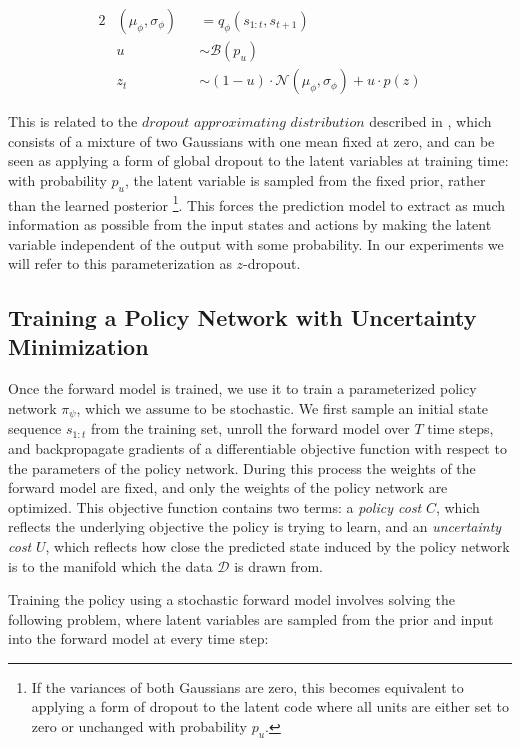\documentclass{article} %
\begin{document}
\begin{alignat}{2}
  \label{eq:update-eqn}
  &(\mu_\phi, \sigma_\phi) &&= q_\phi(s_{1:t}, s_{t+1}) \\
  &u &&\sim \mathcal{B}(p_u) \\
  &z_t &&\sim (1-u) \cdot \mathcal{N}(\mu_\phi, \sigma_\phi) + u \cdot p(z)
\end{alignat}

This is related to the $\textit{dropout approximating distribution}$ described in \citep{Gal16}, which consists of a mixture of two Gaussians with one mean fixed at zero, and can be seen as applying a form of global dropout to the latent variables at training time: with probability $p_u$, the latent variable is sampled from the fixed prior, rather than the learned posterior \footnote{If the variances of both Gaussians are zero, this becomes equivalent to applying a form of dropout to the latent code where all units are either set to zero or unchanged with probability $p_u$.}.
This forces the prediction model to extract as much information as possible from the input states and actions by making the latent variable independent of the output with some probability. In our experiments we will refer to this parameterization as $z$-dropout.


\subsection{Training a Policy Network with Uncertainty Minimization}
\label{uncertainty-minimization}

Once the forward model is trained, we use it to train a parameterized policy network $\pi_\psi$, which we assume to be stochastic.
We first sample an initial state sequence $s_{1:t}$ from the training set, unroll the forward model over $T$ time steps, and backpropagate gradients of a differentiable objective function with respect to the parameters of the policy network.
During this process the weights of the forward model are fixed, and only the weights of the policy network are optimized.
This objective function contains two terms: a \textit{policy cost} $C$, which reflects the underlying objective the policy is trying to learn, and an \textit{uncertainty cost} $U$, which reflects how close the predicted state induced by the policy network is to the manifold which the data $\mathcal{D}$ is drawn from.

Training the policy using a stochastic forward model involves solving the following problem, where latent variables are sampled from the prior and input into the forward model at every time step:
\end{document}
